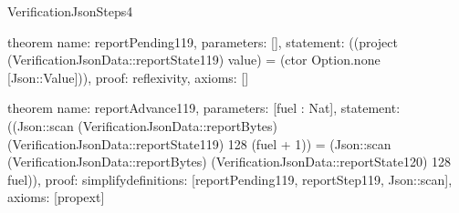 \begin{lexlean}{VerificationJsonSteps4}
\begin{semanticmodule}
theorem{
  name: reportPending119,
  parameters: [],
  statement: ((project (VerificationJsonData::reportState119) value) = (ctor Option.none [Json::Value])),
  proof: reflexivity{},
  axioms: []
}

theorem{
  name: reportAdvance119,
  parameters: [fuel : Nat],
  statement: ((Json::scan (VerificationJsonData::reportBytes) (VerificationJsonData::reportState119) 128 (fuel + 1)) = (Json::scan (VerificationJsonData::reportBytes) (VerificationJsonData::reportState120) 128 fuel)),
  proof: simplify{definitions: [reportPending119, reportStep119, Json::scan]},
  axioms: [propext]
}

\end{semanticmodule}
\end{lexlean}
